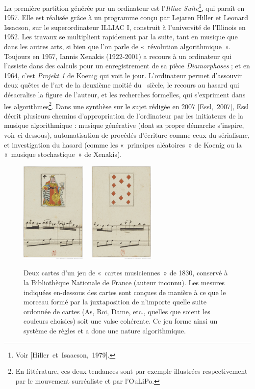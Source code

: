 \documentclass[a4paper,12pt]{article}
\newcommand{\guill}[1]{«~#1~»}
\newcommand{\cicite}[1]{{\footnotesize[#1]}}
\begin{document}
La première partition générée par un ordinateur est l'\emph{Illiac Suite}\footnote{Voir \cicite{Hiller~et~Isaacson,~1979}.}, qui paraît en 1957. Elle est réalisée grâce à un programme conçu par Lejaren Hiller et Leonard Issacson, sur le superordinateur ILLIAC I, construit à l'université de l'Illinois en 1952. Les travaux se multiplient rapidement par la suite, tant en musique que dans les autres arts, si bien que l'on parle de \guill{révolution algorithmique}. Toujours en 1957, Iannis Xenakis (1922-2001) a recours à un ordinateur qui l'assiste dans des calculs pour un enregistrement de sa pièce \emph{Diamorphoses} ; et en 1964, c'est \emph{Projekt 1} de Koenig qui voit le jour. L'ordinateur permet d'assouvir deux quêtes de l'art de la deuxième moitié du \XXe~siècle, le recours au hasard qui désacralise la figure de l'auteur, et les recherches formelles, qui s'expriment dans les algorithmes\footnote{En littérature, ces deux tendances sont par exemple illustrées respectivement par le mouvement surréaliste et par l'OuLiPo.}. Dans une synthèse sur le sujet rédigée en 2007 \cicite{Essl,~2007}, Essl décrit plusieurs chemins d'appropriation de l'ordinateur par les initiateurs de la musique algorithmique : musique générative (dont sa propre démarche s'inspire, voir ci-dessous), automatisation de procédés d'écriture comme ceux du sérialisme, et investigation du hasard (comme les \guill{principes aléatoires} de Koenig ou la \guill{musique stochastique} de Xenakis).

\begin{figure}[!h]
\begin{center}
\includegraphics[height=5cm]{images/carte1.jpg}~~
\includegraphics[height=5cm]{images/carte2.jpg}
\caption{\footnotesize Deux cartes d'un jeu de \guill{cartes musiciennes} de 1830, conservé à la Bibliothèque Nationale de France (auteur inconnu). Les mesures indiquées en-dessous des cartes sont conçues de manière à ce que le morceau formé par la juxtaposition de n'importe quelle suite ordonnée de cartes (As, Roi, Dame, etc., quelles que soient les couleurs choisies) soit une valse cohérente. Ce jeu forme ainsi un système de règles et a donc une nature algorithmique.}
\label{cartesajouer}
\end{center}
\end{figure}
\end{document}
